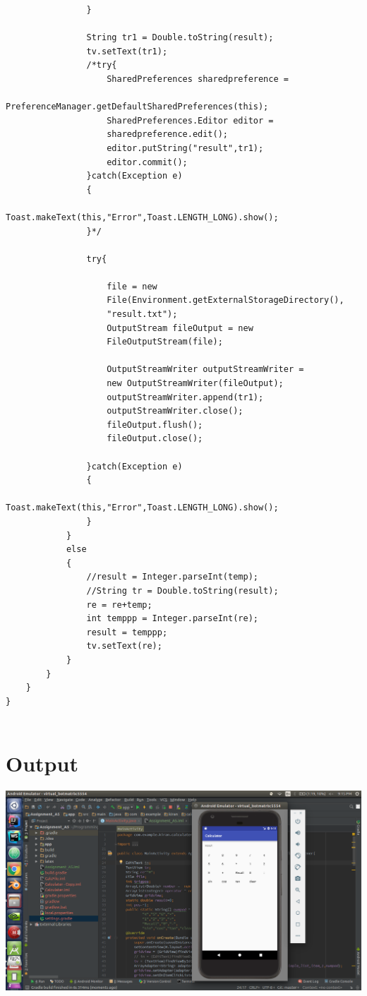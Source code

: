 \documentclass[10pt,a4paper]{article}
\begin{document}
\begin{lstlisting}
                }

                String tr1 = Double.toString(result);
                tv.setText(tr1);
                /*try{
                    SharedPreferences sharedpreference = 
                    PreferenceManager.getDefaultSharedPreferences(this);
                    SharedPreferences.Editor editor = 
                    sharedpreference.edit();
                    editor.putString("result",tr1);
                    editor.commit();
                }catch(Exception e)
                {
                        Toast.makeText(this,"Error",Toast.LENGTH_LONG).show();
                }*/

                try{

                    file = new 
                    File(Environment.getExternalStorageDirectory(),
                    "result.txt");
                    OutputStream fileOutput = new 
                    FileOutputStream(file);

                    OutputStreamWriter outputStreamWriter = 
                    new OutputStreamWriter(fileOutput);
                    outputStreamWriter.append(tr1);
                    outputStreamWriter.close();
                    fileOutput.flush();
                    fileOutput.close();

                }catch(Exception e)
                {
                    Toast.makeText(this,"Error",Toast.LENGTH_LONG).show();
                }
            }
            else
            {
                //result = Integer.parseInt(temp);
                //String tr = Double.toString(result);
                re = re+temp;
                int temppp = Integer.parseInt(re);
                result = temppp;
                tv.setText(re);
            }
        }
    }
}


\end{lstlisting}

\section{Output}
\includegraphics[scale=0.3]{out_1.png}
\end{document}
